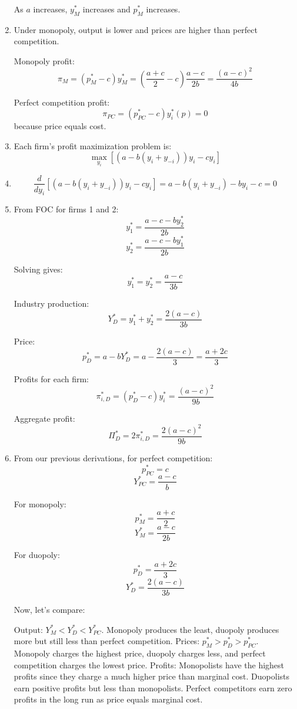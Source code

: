 \documentclass[UTF8,titlepage]{article}
\numberwithin{figure}{section}
\begin{document}
\begin{enumerate}
As \( a \) increases, \( y_M^* \) increases and \( p_M^* \) increases.

\item Under monopoly, output is lower and prices are higher than perfect competition.

Monopoly profit:
\[ \pi_M = (p_M^* - c) y_M^* = (\frac{a + c}{2} - c) \frac{a - c}{2b} = \frac{(a - c)^2}{4b} \]

Perfect competition profit:
\[ \pi_{PC} = (p_{PC}^* - c) y_i^*(p) = 0 \]
because price equals cost.

\item Each firm's profit maximization problem is:
\[ \max_{y_i} \left[ (a - b(y_i + y_{-i}))y_i - c y_i \right] \]

\item \[ \frac{d}{dy_i} [(a - b(y_i + y_{-i}))y_i - c y_i] = a - b(y_i + y_{-i}) - by_i - c = 0 \]

\item From FOC for firms 1 and 2:
\[ y_1^* = \frac{a - c - b y_2^*}{2b} \]
\[ y_2^* = \frac{a - c - b y_1^*}{2b} \]

Solving gives:
\[ y_1^* = y_2^* = \frac{a - c}{3b} \]

Industry production:
\[ Y_D^* = y_1^* + y_2^* = \frac{2(a - c)}{3b} \]

Price:
\[ p_D^* = a - b Y_D^* = a - \frac{2(a - c)}{3} = \frac{a + 2c}{3} \]

Profits for each firm:
\[ \pi_{i, D}^* = (p_D^* - c) y_i^* = \frac{(a - c)^2}{9b} \]

Aggregate profit:
\[ \Pi_D^* = 2 \pi_{i, D}^* = \frac{2(a - c)^2}{9b} \]

\item From our previous derivations, for perfect competition:
\[ p_{PC}^* = c \]
\[ Y_{PC}^* = \frac{a - c}{b} \]

For monopoly:
\[ p_M^* = \frac{a + c}{2} \]
\[ Y_M^* = \frac{a - c}{2b} \]

For duopoly:
\[ p_D^* = \frac{a + 2c}{3} \]
\[ Y_D^* = \frac{2(a - c)}{3b} \]

Now, let's compare:

Output: \( Y_M^* < Y_D^* < Y_{PC}^* \). Monopoly produces the least, duopoly produces more but still less than perfect competition.
Prices: \( p_M^* > p_D^* > p_{PC}^* \). Monopoly charges the highest price, duopoly charges less, and perfect competition charges the lowest price.
Profits: Monopolists have the highest profits since they charge a much higher price than marginal cost. Duopolists earn positive profits but less than monopolists. Perfect competitors earn zero profits in the long run as price equals marginal cost.


\end{enumerate}
\end{document}
